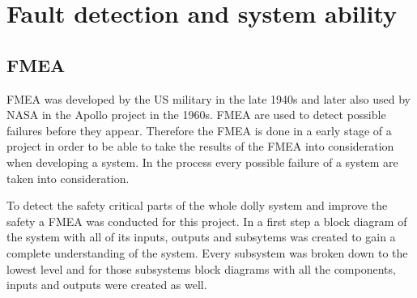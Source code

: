 \documentclass[ExampleMasters.tex]{subfiles}
\begin{document}
\clearpage
{\pagestyle{empty}\cleardoublepage}%

\chapter{Fault detection and system ability}
\label{chap:fault_detection}
\section{\acrlong{FMEA}}
\label{sec:FMEA}
\acrfull{FMEA} was developed by the US military in the late 1940s and later also used by NASA in the Apollo project in the 1960s.
\gls{FMEA} are used to detect possible failures before they appear. Therefore the \gls{FMEA} is done in a early stage of a project in order to be able to take the results of the \gls{FMEA} into consideration when developing a system. In the process every possible failure of a system are taken into consideration. 

To detect the safety critical parts of the whole dolly system and improve the safety a \gls{FMEA} was conducted for this project.
In a first step a block diagram of the system with all of its inputs, outputs and subsytems was created to gain a complete understanding of the system. Every subsystem was broken down to the lowest level and for those subsystems block diagrams with all the components, inputs and outputs were created as well.
\end{document}
